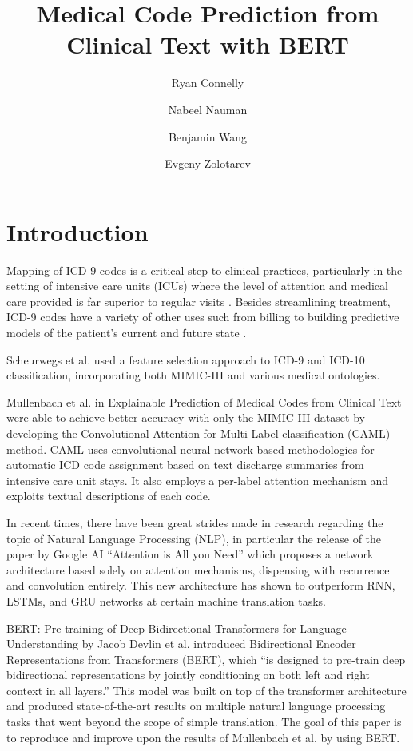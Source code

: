 \documentclass[fleqn,10pt]{olplainarticle}
\title{Medical Code Prediction from Clinical Text with BERT}
\author[1]{Ryan Connelly}
\author[2]{Nabeel Nauman}
\author[3]{Benjamin Wang}
\author[4]{Evgeny Zolotarev}
\affil[1]{rconnelly3@gatech.edu}
\affil[2]{nabeelnau@gmail.com}
\affil[3]{bwang421@gatech.edu}
\affil[4]{ezolotarev3@gatech.edu}
\begin{document}
\flushbottom
\maketitle
\thispagestyle{empty}

\section{Introduction}

Mapping of ICD-9 codes is a critical step to clinical practices, particularly in the setting of intensive care units (ICUs) where the level of attention and medical care provided is far superior to regular visits \cite{mortalityPredictionUsingFuzzyClassifier}. Besides streamlining treatment, ICD-9 codes have a variety of other uses such from billing to building predictive models of the patient’s current and future state \cite{nlpProcessingForClinicalDecisionSupport}.

Scheurwegs et al. \cite{scheurwegsSelectingRelevantFeaturesFromEHR} used a feature selection approach to ICD-9 and ICD-10 classification, incorporating both MIMIC-III and various medical ontologies.

Mullenbach et al. in Explainable Prediction of Medical Codes from Clinical Text \cite{explainablePredictionMedicalCodes} were able to achieve better accuracy with only the MIMIC-III dataset by developing the Convolutional Attention for Multi-Label classification (CAML) method. CAML uses convolutional neural network-based methodologies for automatic ICD code assignment based on text discharge summaries from intensive care unit stays. It also employs a per-label attention mechanism and exploits textual descriptions of each code. 

In recent times, there have been great strides made in research regarding the topic of Natural Language Processing (NLP), in particular the release of the paper by Google AI “Attention is All you Need” \cite{attentionIsAllYouNeed} which proposes a network architecture based solely on attention mechanisms, dispensing with recurrence and convolution entirely. This new architecture has shown to outperform RNN, LSTMs, and GRU networks at certain machine translation tasks.

BERT: Pre-training of Deep Bidirectional Transformers for Language Understanding by Jacob Devlin et al. \cite{bertPaper} introduced Bidirectional Encoder Representations from Transformers (BERT), which “is designed to pre-train deep bidirectional representations by jointly conditioning on both left and right context in all layers.” This model was built on top of the transformer architecture and produced state-of-the-art results on multiple natural language processing tasks that went beyond the scope of simple translation. The goal of this paper is to reproduce and improve upon the results of Mullenbach et al. \cite{explainablePredictionMedicalCodes} by using BERT.
\end{document}
